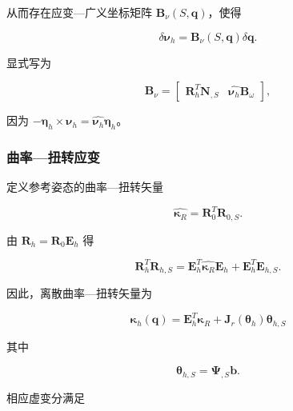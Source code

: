 从而存在应变---广义坐标矩阵 \(\mathbf{B}_{\nu}\left( S,\mathbf{q} \right)\)，使得

\begin{equation}
\label{eq:galerkin-2-19}
\delta\bm{\nu}_{h} = \mathbf{B}_{\nu}\left( S,\mathbf{q} \right)\delta\mathbf{q}.
\end{equation}

显式写为

\begin{equation}
\label{eq:galerkin-2-20}
\mathbf{B}_{\nu} = \begin{bmatrix}
\mathbf{R}_{h}^{T}\mathbf{N}_{,S} & \widehat{\bm{\nu}_{h}}\mathbf{B}_{\omega}
\end{bmatrix},
\end{equation}

因为 \(- \bm{\eta}_{h} \times \bm{\nu}_{h} = \widehat{\bm{\nu}_{h}}\bm{\eta}_{h}\)。

\subsubsection{曲率---扭转应变}\label{sec:galerkin-2-3-2}

定义参考姿态的曲率---扭转矢量

\begin{equation}
\label{eq:galerkin-2-21}
\widehat{\bm{\kappa}_{R}} = \mathbf{R}_{0}^{T}\mathbf{R}_{0,S}.
\end{equation}

由 \(\mathbf{R}_{h} = \mathbf{R}_{0}\mathbf{E}_{h}\) 得

\begin{equation}
\label{eq:galerkin-2-22}
\mathbf{R}_{h}^{T}\mathbf{R}_{h,S} = \mathbf{E}_{h}^{T}\widehat{\bm{\kappa}_{R}}\mathbf{E}_{h} + \mathbf{E}_{h}^{T}\mathbf{E}_{h,S}.
\end{equation}

因此，离散曲率---扭转矢量为

\begin{equation}
\label{eq:galerkin-2-23}
\boxed{\bm{\kappa}_{h}\left( \mathbf{q} \right) = \mathbf{E}_{h}^{T}\bm{\kappa}_{R} + \mathbf{J}_{r}\left( \bm{\theta}_{h} \right)\bm{\theta}_{h,S}}
\end{equation}

其中

\begin{equation}
\label{eq:galerkin-2-24}
\bm{\theta}_{h,S} = \bm{\Psi}_{,S}\mathbf{b}.
\end{equation}

相应虚变分满足

